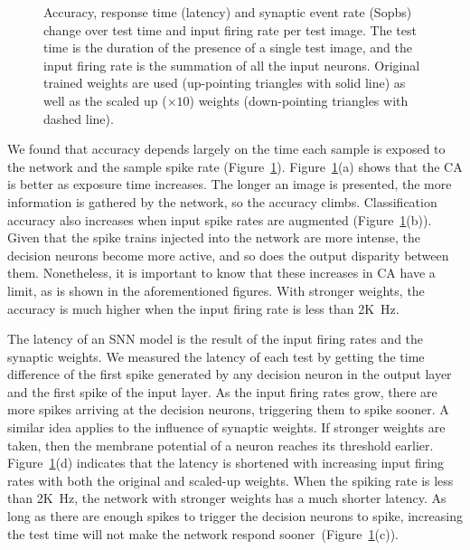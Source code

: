 \begin{figure}[htb!]
	\caption[Comparisons on different test time and input firing rate.]{Accuracy, response time (latency) and synaptic event rate (Sopbs) change over test time and input firing rate per test image.
		The test time is the duration of the presence of a single test image, and the input firing rate is the summation of all the input neurons.
		Original trained weights are used (up-pointing triangles with solid line) as well as the scaled up ($\times10$) weights (down-pointing triangles with dashed line). }
	\label{fig:assess}
\end{figure}

We found that accuracy depends largely on the time each sample is exposed to the network and the sample spike rate (Figure~\ref{fig:assess}).
Figure~\ref{fig:assess}(a) shows that the CA is better as exposure time increases. The longer an image is presented, the more information is gathered by the network, so the accuracy climbs.
Classification accuracy also increases when input spike rates are augmented (Figure~\ref{fig:assess}(b)).
Given that the spike trains injected into the network are more intense, the decision neurons become more active, and so does the output disparity between them.
Nonetheless, it is important to know that these increases in CA have a limit, as is shown in the aforementioned figures.
With stronger weights, the accuracy is much higher when the input firing rate is less than 2K~Hz.


The latency of an SNN model is the result of the input firing rates and the synaptic weights.
We measured the latency of each test by getting the time difference of the first spike generated by any decision neuron in the output layer and the first spike of the input layer.
As the input firing rates grow, there are more spikes arriving at the decision neurons, triggering them to spike sooner.
A similar idea applies to the influence of synaptic weights.
If stronger weights are taken, then the membrane potential of a neuron reaches its threshold earlier.
Figure~\ref{fig:assess}(d) indicates that the latency is shortened with increasing input firing rates with both the original and scaled-up weights.
When the spiking rate is less than 2K~Hz, the network with stronger weights has a much shorter latency.
As long as there are enough spikes to trigger the decision neurons to spike, increasing the test time will not make the network respond sooner~(Figure~\ref{fig:assess}(c)).

